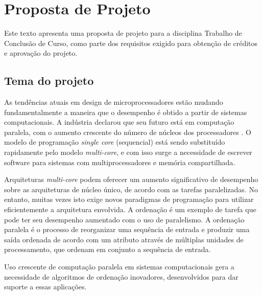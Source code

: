 \chapter{Proposta de Projeto}

Este texto apresenta uma proposta de projeto para a disciplina Trabalho de Conclusão de Curso, como parte dos requisitos exigido para obtenção de créditos e aprovação do projeto. 

\section{Tema do projeto}




As tendências atuais em design de microprocessadores estão mudando fundamentalmente a maneira que o desempenho é obtido a partir de sistemas computacionais. 
A indústria declarou que seu futuro está em computação paralela, com o aumento crescente do número de núcleos dos processadores \cite{Asanovic:2009}.
O modelo de programação \textit{single core} (sequencial) está sendo substituído rapidamente pelo modelo \textit{multi-core}, e com isso surge a necessidade de escrever software para sistemas com multiprocessadores e memória compartilhada. \cite{Ernst:2009}

Arquiteturas \textit{multi-core} podem oferecer um aumento significativo de desempenho sobre as arquiteturas de núcleo único, de acordo com as tarefas paralelizadas. No entanto, muitas vezes isto exige novos paradigmas de programação para utilizar eficientemente a arquitetura envolvida. \cite{Prinslow:2011} A ordenação
é um exemplo de tarefa que pode ter seu desempenho aumentado com o uso de paralelismo. 
A ordenação paralela é o processo de reorganizar uma sequência de entrada e produzir uma saída ordenada de acordo com um atributo através de múltiplas unidades de processamento, que ordenam em conjunto a sequência de entrada. 


Uso crescente de computação paralela em sistemas computacionais gera a necessidade de algoritmos de ordenação inovadores, desenvolvidos para dar suporte a essas aplicações. 


